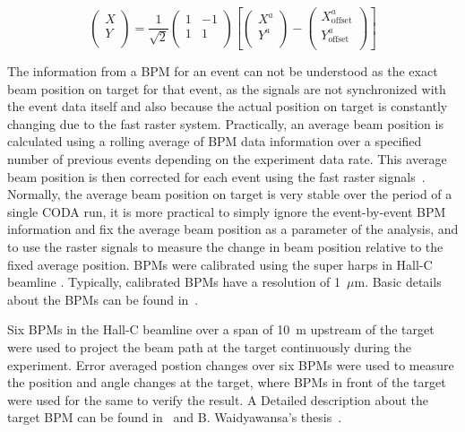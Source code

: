 \begin{equation} \label{equ:bpm3}
\left( \begin{array}{c}
X \\
Y \\
\end{array} \right)
=
\frac{1}{\sqrt{2}}
\left( \begin{array}{cc}
1 & -1\\
1 & 1\\
\end{array} \right)
\left[\left( \begin{array}{c}
X^{a} \\
Y^{a} \\
\end{array} \right)
-
\left( \begin{array}{c}
X^{a}_{\textrm{offset}} \\
Y^{a}_{\textrm{offset}} \\
\end{array} \right)\right]
\end{equation}

The information from a BPM for an event can not be understood as the exact beam position on target for that event, as the signals are not synchronized with the event data itself and also because the actual position on target is constantly changing due to the fast raster system. Practically, an average beam position is calculated using a rolling average of BPM data information over a specified number of previous events depending on the experiment data rate. This average beam position is then corrected for each event using the fast raster signals~\cite{puckett_GEPIII}. Normally, the average beam position on target is very stable over the period of a single CODA run, it is more practical to simply ignore the event-by-event BPM information and fix the average beam position as a parameter of the analysis, and to use the raster signals to measure the change in beam position relative to the fixed average position. BPMs were calibrated using the super harps in Hall-C beamline \cite{hauger_polarimeter}. Typically, calibrated BPMs have a resolution of 1~$\mu$m. 
Basic details about the BPMs can be found in~\cite{bpm2}.

Six BPMs in the Hall-C beamline over a span of 10~m upstream of the target were used to project the beam path at the target continuously during the experiment. Error averaged postion changes over six BPMs were used to measure the position and angle changes at the target, where BPMs in front of the target were used for the same to verify the result. A Detailed description about the target BPM can be found in~\cite{nur_linear_reg, leo_book} and B. Waidyawansa's thesis~\cite{buddhini_qweak}.


